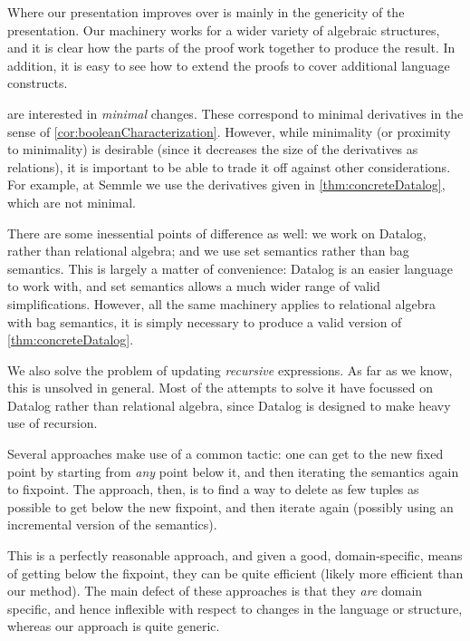 Where our presentation improves over \citeauthor{griffin1997improved} is mainly in
the genericity of the presentation. Our machinery works for a wider variety of
algebraic structures, and it is clear how the parts of the proof work together
to produce the result. In addition, it is easy to see how to extend the proofs
to cover additional language constructs.

\citeauthor{griffin1997improved} are interested in \emph{minimal} changes. These correspond to
minimal derivatives in the sense of \cref{cor:booleanCharacterization}. However,
while minimality (or proximity to minimality) is desirable (since it decreases
the size of the derivatives as relations), it is important to be able to trade
it off against other considerations. For example, at
Semmle we use the derivatives given in \cref{thm:concreteDatalog}, which are not minimal.

There are some inessential points of difference as well: we work on Datalog,
rather than relational algebra; and we use set semantics rather than bag
semantics. This is largely a matter of convenience: Datalog is an easier
language to work with, and set semantics allows a much wider range of valid
simplifications. However, all the same machinery applies to relational algebra
with bag semantics, it is simply necessary to produce a valid version of \cref{thm:concreteDatalog}.

We also solve the problem of updating \emph{recursive} expressions. As far as we
know, this is unsolved in general. Most of the attempts to solve it have
focussed on Datalog rather than relational algebra, since Datalog is designed to
make heavy use of recursion.

Several approaches
\autocites{gupta1993maintaining}{harrison1992maintenance}
make use of a common tactic: one can get to the new fixed
point by starting from \emph{any} point below it, and then iterating the
semantics again to fixpoint. The approach, then, is to find a way to delete as
few tuples as possible to get below the new fixpoint, and then iterate again
(possibly using an incremental version of the semantics).

This is a perfectly reasonable approach, and given a good, domain-specific,
means of getting below the fixpoint, they can be quite efficient (likely more
efficient than our method). The main defect of these approaches is that they
\emph{are} domain specific, and hence inflexible with respect to changes in the
language or structure, whereas our approach is quite generic.

